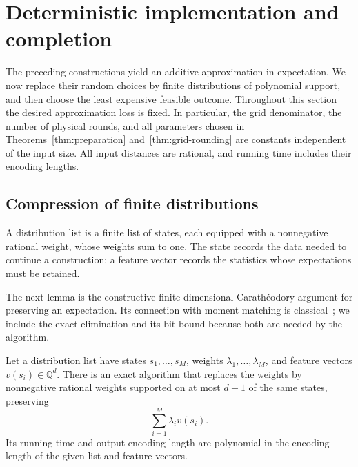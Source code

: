 \section{Deterministic implementation and completion}
\label{sec:derandomization}

The preceding constructions yield an additive approximation in expectation.
We now replace their random choices by finite distributions of polynomial
support, and then choose the least expensive feasible outcome. Throughout
this section the desired approximation loss is fixed. In particular, the
grid denominator, the number of physical rounds, and all parameters chosen
in Theorems~\ref{thm:preparation} and~\ref{thm:grid-rounding} are constants
independent of the input size. All input distances are rational, and
running time includes their encoding lengths.

\subsection{Compression of finite distributions}

A distribution list is a finite list of states, each equipped with a
nonnegative rational weight, whose weights sum to one. The state records
the data needed to continue a construction; a feature vector records the
statistics whose expectations must be retained.

The next lemma is the constructive finite-dimensional Carath\'eodory
argument for preserving an expectation. Its connection with moment
matching is classical~\cite{BayerTeichmann2005}; we include the exact
elimination and its bit bound because both are needed by the algorithm.

\begin{lemma}
\label{lem:affine-support}
Let a distribution list have states \(s_1,\ldots,s_M\), weights
\(\lambda_1,\ldots,\lambda_M\), and feature vectors
\(v(s_i)\in\mathbb Q^d\). There is an exact algorithm that replaces the
weights by nonnegative rational weights supported on at most \(d+1\) of
the same states, preserving
\[
  \sum_{i=1}^M\lambda_i v(s_i).
\]
Its running time and output encoding length are polynomial in the
encoding length of the given list and feature vectors.
\end{lemma}


